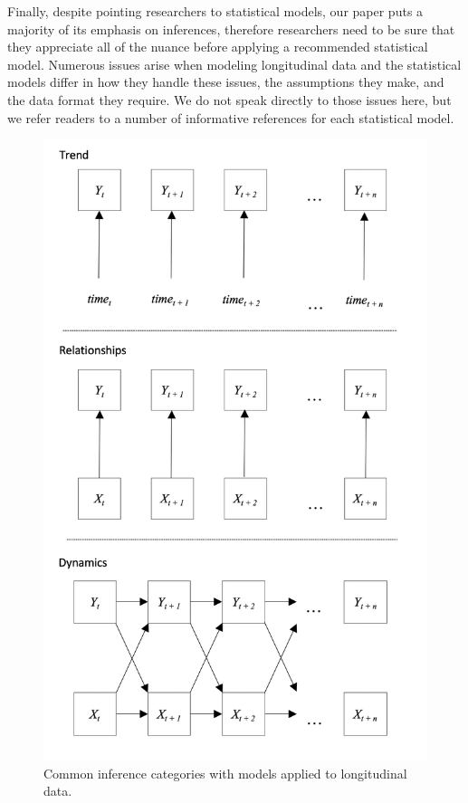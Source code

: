\documentclass[english,,man]{apa6}
\theoremstyle{definition}
\theoremstyle{definition}
\theoremstyle{definition}
\theoremstyle{remark}
\begin{document}
Finally, despite pointing researchers to statistical models, our paper
puts a majority of its emphasis on inferences, therefore researchers
need to be sure that they appreciate all of the nuance before applying a
recommended statistical model. Numerous issues arise when modeling
longitudinal data and the statistical models differ in how they handle
these issues, the assumptions they make, and the data format they
require. We do not speak directly to those issues here, but we refer
readers to a number of informative references for each statistical
model.

\begin{figure}

{\centering \includegraphics[width=4.66in]{figures/dynamics/framework} 

}

\caption{Common inference categories with models applied to longitudinal data.\label{framework_figure}}\label{fig:unnamed-chunk-6}
\end{figure}
\end{document}
